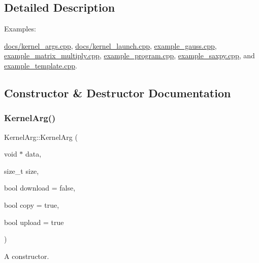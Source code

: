 \subsection{Detailed Description}
\begin{Desc}
\item[Examples\+: ]\par
\hyperlink{docs_2kernel_args_8cpp-example}{docs/kernel\+\_\+args.\+cpp}, \hyperlink{docs_2kernel_launch_8cpp-example}{docs/kernel\+\_\+launch.\+cpp}, \hyperlink{example_gauss_8cpp-example}{example\+\_\+gauss.\+cpp}, \hyperlink{example_matrix_multiply_8cpp-example}{example\+\_\+matrix\+\_\+multiply.\+cpp}, \hyperlink{example_program_8cpp-example}{example\+\_\+program.\+cpp}, \hyperlink{example_saxpy_8cpp-example}{example\+\_\+saxpy.\+cpp}, and \hyperlink{example_template_8cpp-example}{example\+\_\+template.\+cpp}.\end{Desc}


\subsection{Constructor \& Destructor Documentation}
\mbox{\label{classyacx_1_1_kernel_arg_a10f9f7255e69ef20c0cad5ed4e091c94}} 
\subsubsection{\texorpdfstring{Kernel\+Arg()}{KernelArg()}\hspace{0.1cm}{\footnotesize\ttfamily [1/2]}}
{\footnotesize\ttfamily Kernel\+Arg\+::\+Kernel\+Arg (\begin{DoxyParamCaption}\item[{void $\ast$}]{data,  }\item[{size\+\_\+t}]{size,  }\item[{bool}]{download = {\ttfamily false},  }\item[{bool}]{copy = {\ttfamily true},  }\item[{bool}]{upload = {\ttfamily true} }\end{DoxyParamCaption})}



A constructor. 


